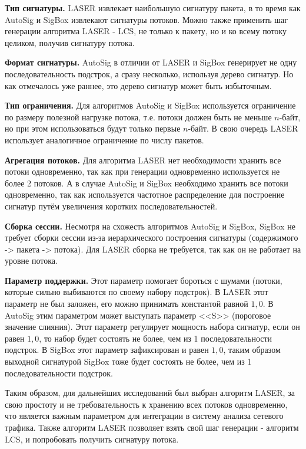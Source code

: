 \textbf{Тип сигнатуры.} LASER извлекает наибольшую сигнатуру пакета, в то время как AutoSig и SigBox извлекают сигнатуры потоков.
Можно также применить шаг генерации алгоритма LASER - LCS, не только к пакету, но и ко всему потоку целиком, получив сигнатуру потока.

\textbf{Формат сигнатуры.} AutoSig в отличии от LASER и SigBox генерирует не одну последовательность подстрок,
а сразу несколько, используя дерево сигнатур.
Но как отмечалось уже раннее, это дерево сигнатур может быть избыточным.

\textbf{Тип ограничения.} Для алгоритмов AutoSig и SigBox используется ограничение по размеру полезной нагрузке потока,
т.е. потоки должен быть не меньше $n$-байт, но при этом использоваться будут только первые $n$-байт.
В свою очередь LASER использует аналогичное ограничение по числу пакетов.

\textbf{Агрегация потоков.} Для алгоритма LASER нет необходимости хранить все потоки одновременно,
так как при генерации одновременно используется не более 2 потоков.
А в случае AutoSig и SigBox необходимо хранить все потоки одновременно,
так как используется частотное распределение для построение сигнатур путём увеличения коротких последовательностей.

\textbf{Сборка сессии.} Несмотря на схожесть алгоритмов AutoSig и SigBox,
SigBox не требует сборки сессии из-за иерархического построения сигнатуры (содержимого -> пакета -> потока).
Для LASER сборка не требуется, так как он не работает на уровне потока.

\textbf{Параметр поддержки.} Этот параметр помогает бороться с шумами (потоки, которые сильно выбиваются по своему набору подстрок).
В LASER этот параметр не был заложен, его можно принимать константой равной $1,0$. В AutoSig этим параметром может выступать параметр <<S>> (пороговое значение слияния).
Этот параметр регулирует мощность набора сигнатур, если он равен $1,0$, то набор будет состоять не более, чем из 1 последовательности подстрок.
В SigBox этот параметр зафиксирован и равен $1,0$, таким образом
выходной сигнатурой SigBox тоже будет состоять не более, чем из 1 последовательности подстрок.

Таким образом, для дальнейших исследований был выбран алгоритм LASER, за свою простоту и не требовательность
к хранению всех потоков одновременно, что является важным параметром для интеграции в систему анализа сетевого трафика.
Также алгоритм LASER позволяет взять свой шаг генерации - алгоритм LCS, и попробовать получить сигнатуру потока.

